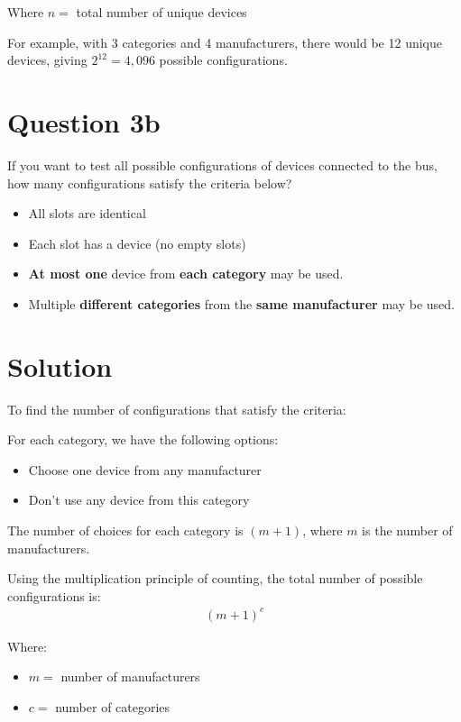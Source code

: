 \documentclass{article}
\begin{document}
Where $n =$ total number of unique devices 

For example, with 3 categories and 4 manufacturers, there would be 12 unique devices, giving $2^{12} = 4,096$ possible configurations.


\section*{Question 3b}

If you want to test all possible configurations of devices connected to the bus, how many configurations satisfy the criteria below?

\begin{itemize}
    \item All slots are identical 
    \item Each slot has a device (no empty slots)
\end{itemize}

\begin{itemize}
    \item \textbf{At most one} device from \textbf{each category} may be used.
    \item Multiple \textbf{different categories} from the \textbf{same manufacturer} may be used.
\end{itemize}

\section*{Solution}

To find the number of configurations that satisfy the criteria:

For each category, we have the following options:
\begin{itemize}
    \item Choose one device from any manufacturer
    \item Don't use any device from this category
\end{itemize}

The number of choices for each category is $(m + 1)$, where $m$ is the number of manufacturers.

Using the multiplication principle of counting, the total number of possible configurations is:
\begin{align}
    (m + 1)^c
\end{align}

Where:
\begin{itemize}
    \item $m =$ number of manufacturers
    \item $c =$ number of categories
\end{itemize}
\end{document}
